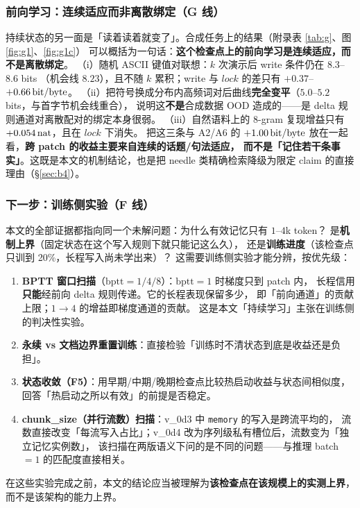 \subsubsection{前向学习：连续适应而非离散绑定（G 线）}\label{sec:gline}

持续状态的另一面是「读着读着就变了」。合成任务上的结果（附录表 \ref{tab:g}、图 \ref{fig:g1}、\ref{fig:g1c}）
可以概括为一句话：\textbf{这个检查点上的前向学习是连续适应，而不是离散绑定}。
（i）随机 ASCII 键值对联想：$k$ 次演示后 write 条件仍在 $8.3$--$8.6$ bits
（机会线 $8.23$），且不随 $k$ 累积；write 与 $\mathit{lock}$ 的差只有 $+0.37$--$+0.66\,\mathrm{bit/byte}$。
（ii）把符号换成分布内高频词对后曲线\textbf{完全变平}（$5.0$--$5.2$ bits，与首字节机会线重合），
说明这\textbf{不是}合成数据 OOD 造成的——是 delta 规则通道对离散配对的绑定本身很弱。
（iii）自然语料上的 $8$-gram 复现增益只有 $+0.054\,\mathrm{nat}$，且在 $\mathit{lock}$ 下消失。
把这三条与 A2/A6 的 $+1.00\,\mathrm{bit/byte}$ 放在一起看，\textbf{跨 patch 的收益主要来自连续的话题/句法适应，
而不是「记住若干条事实」}。这既是本文的机制结论，也是把 needle 类精确检索降级为限定 claim 的直接理由（\S\ref{sec:b4}）。

\subsubsection{下一步：训练侧实验（F 线）}\label{sec:f-line}

本文的全部证据都指向同一个未解问题：为什么有效记忆只有 $1$--$4$k token？
是\textbf{机制上界}（固定状态在这个写入规则下就只能记这么久），
还是\textbf{训练进度}（该检查点只训到 20\%，长程写入尚未学出来）？
这需要训练侧实验才能分辨，按优先级：

\begin{enumerate}\itemsep3pt
\item \textbf{BPTT 窗口扫描}（$\mathrm{bptt}=1/4/8$）：$\mathrm{bptt}=1$ 时梯度只到 patch 内，
长程信用\textbf{只能}经前向 delta 规则传递。它的长程表现保留多少，
即「前向通道」的贡献上限；$1\to4$ 的增益即梯度通道的贡献。
这是本文「持续学习」主张在训练侧的判决性实验。
\item \textbf{永续 vs 文档边界重置训练}：直接检验「训练时不清状态到底是收益还是负担」。
\item \textbf{状态收敛（F5）}：用早期/中期/晚期检查点比较热启动收益与状态间相似度，
回答「热启动之所以有效」的前提是否稳定。
\item \textbf{chunk\_size（并行流数）扫描}：v\_0d3 中 \texttt{memory} 的写入是跨流平均的，
流数直接改变「每流写入占比」；v\_0d4 改为序列级私有槽位后，流数变为「独立记忆实例数」，
该扫描在两版语义下问的是不同的问题——与推理 batch$=1$ 的匹配度直接相关。
\end{enumerate}

在这些实验完成之前，本文的结论应当被理解为\textbf{该检查点在该规模上的实测上界}，
而不是该架构的能力上界。
